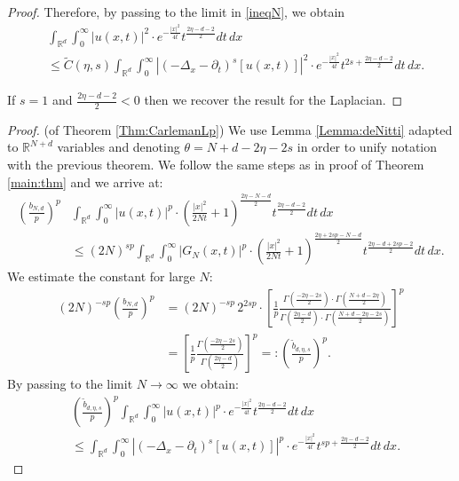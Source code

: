\documentclass[11pt, twoside, notitlepage]{amsart}
\newcommand\R{\mathbb{R}}
\numberwithin{equation}{section}
\begin{document}
\begin{proof}
Therefore, by passing to the limit in \eqref{ineqN}, we obtain
\begin{align*}
&\int_{\R^{d}}\int_0^\infty |u(x,t )|^2 \cdot e ^{-\frac{|x|^2}{4t}}     t^{\frac{  2\eta-d -2 }{2}}  dt\,  dx \\
&\le  \widetilde{C}(\eta,s) \int_{\R^{d}}\int_0^\infty  \left| ( -\Delta_x-\partial_t)^{s} [u(x,t)]  \right|^2  \cdot e ^{-\frac{|x|^2}{4t}}   t^{2s + \frac{2\eta -d-2}{2}} dt \, dx.
\end{align*}


If $s=1$ and $\frac{  2\eta-d -2 }{2} <0$ then we recover the result for the Laplacian.


\end{proof}



\begin{proof}(of Theorem \ref{Thm:CarlemanLp})
We use Lemma \ref{Lemma:deNitti} adapted to $\R^{N+d}$ variables and  denoting $\theta=N+d-2\eta-2s$ in order to unify notation with the previous theorem.    We follow the same steps as in proof of Theorem \ref{main:thm} and we arrive at:
  \begin{align*}
  \left(\frac{b_{N,d}}{p}\right)^p
&\int_{\R^{d}}\int_0^\infty |u(x,t )|^p \cdot \left( \frac{|x|^2}{2 N t}+1 \right)^{\frac{{2\eta - N-d}}{2}}    t^{\frac{  2\eta-d -2 }{2}}  dt \, dx \\
&\le (2N)^{sp} \int_{\R^{d}}\int_0^\infty  \left| G_N(x,t  )  \right|^p  \cdot \left(\frac{|x|^2}{2N t}+1 \right)^{\frac{ 2\eta +2sp - N-d}{2}}  t^{\frac{ 2\eta -d+2sp-2}{2}} dt\, dx.
\end{align*}
  We estimate the constant for large $N$:
  \begin{align*}
    (2N)^{-sp}   \left(\frac{b_{N,d}}{p}\right)^p  & =  (2N)^{-sp} \,
    2^{2sp}  \cdot \left[ \frac{1}{p}
  \frac{
  \Gamma\left(  \frac{ - 2\eta-2s}{2} \right) \cdot  \Gamma\left( \frac{N+d-2\eta}{2}\right)
  }
  {
   \Gamma \left(\frac{2\eta-d}{2} \right) \cdot  \Gamma\left(  \frac{N+d-2\eta-2s}{2}\right)
   } \right]^p  \\
    &= \left[\frac{1}{p}
      \frac{
  \Gamma\left(  \frac{ - 2\eta-2s}{2} \right)
  }
  {
   \Gamma \left(\frac{2\eta-d}{2} \right)
   } \right]^p =:\left(\frac{\tilde{b}_{d,\eta,s}}{p}\right)^p.
      \end{align*}
    By passing to the limit $N\to \infty$  we obtain:
  \begin{align*}
&  \left(\frac{\tilde{b}_{d,\eta,s}}{p}\right)^p \int_{\R^{d}}\int_0^\infty |u(x,t )|^p   \cdot e ^{-\frac{|x|^2}{4t}}     t^{\frac{  2\eta-d -2 }{2}}  dt\, dx \\
&\le   \int_{\R^{d}}\int_0^\infty  \left| ( -\Delta_x-\partial_t)^{s} [u(x,t)]  \right|^p  \cdot e ^{-\frac{|x|^2}{4t}}   t^{ sp + \frac{2\eta -d-2}{2}} dt \, dx.
\end{align*}
\end{proof}
\end{document}

